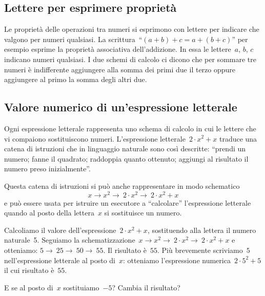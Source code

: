 
\subsection{Lettere per esprimere proprietà}

Le proprietà delle operazioni tra numeri si esprimono con lettere per 
indicare che valgono per numeri qualsiasi.
La scrittura~``$(a+b)+c=a+(b+c)$'' per esempio esprime la proprietà 
associativa dell'addizione. In essa le lettere~$a$, $b$, $c$ indicano
numeri qualsiasi. I due schemi di calcolo ci dicono che per sommare tre 
numeri è indifferente aggiungere alla somma dei primi due il terzo oppure 
aggiungere al primo la somma degli altri due.


\subsection{Valore numerico di un'espressione letterale}
\label{subsec:valnum}

Ogni espressione letterale rappresenta uno schema di calcolo in cui le 
lettere che vi compaiono sostituiscono numeri.
L'espressione letterale~$2\cdot x^{2}+x$ traduce una catena di istruzioni 
che in linguaggio naturale sono così descritte: ``prendi un numero; 
fanne il quadrato; raddoppia quanto ottenuto; aggiungi al risultato 
il numero preso inizialmente''.

Questa catena di istruzioni si può anche rappresentare in modo schematico
\[x\rightarrow x^{2}\rightarrow~2\cdot x^{2}\rightarrow~2\cdot x^{2}+x\]
e può essere usata per istruire un esecutore a ``calcolare'' l'espressione 
letterale quando al posto della lettera~$x$ si sostituisce un numero.

Calcoliamo il valore dell'espressione~$2\cdot x^{2}+x$, sostituendo alla 
lettera il numero naturale~5.
Seguiamo la schematizzazione~$x\rightarrow x^{2}\rightarrow~2\cdot x^{2}\rightarrow~2\cdot x^{2}+x$ e otteniamo:
$5\rightarrow~25\rightarrow~50\rightarrow~55$.
Il risultato è~$55$.
Più brevemente scriviamo~$5$ nell'espressione letterale al posto di~$x$: 
otteniamo l'espressione numerica~$2\cdot 5^{2}+5$ il cui risultato è~$55$.

E se al posto di~$x$ sostituiamo~$-5$? Cambia il risultato?

